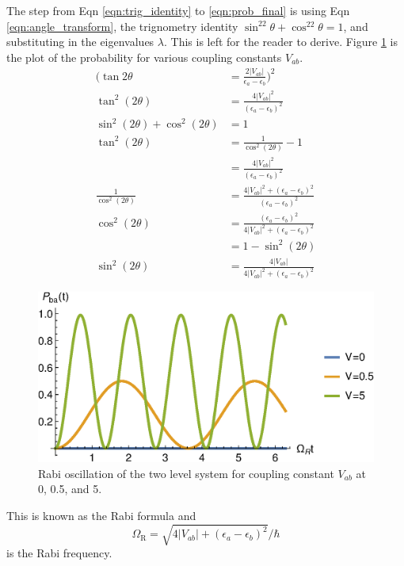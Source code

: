 \documentclass{article}
\begin{document}
The step from Eqn \eqref{eqn:trig_identity} to \eqref{eqn:prob_final}
is using Eqn \eqref{eqn:angle_transform}, the trignometry identity
$\sin^22\theta + \cos^22\theta = 1$, and substituting in the eigenvalues $\lambda$.
This is left for the reader to derive. Figure \ref{fig:prob} is the plot of
the probability for various coupling constants $V_{ab}$.
\begin{align*}
  \Bigg(\tan 2\theta & =  \frac{2|V_{ab}|}{\epsilon_a-\epsilon_b}\Bigg)^2 \\
  \tan^2(2\theta) & = \frac{4|V_{ab}|^2}{(\epsilon_a-\epsilon_b)^2} \\
  \sin^2(2\theta) + \cos^2(2\theta) & = 1 \\
  \tan^2(2\theta) & = \frac{1}{\cos^2(2\theta)} - 1 \\
  & = \frac{4|V_{ab}|^2}{(\epsilon_a-\epsilon_b)^2} \\
  \frac{1}{\cos^2(2\theta)} & = \frac{4|V_{ab}|^2 + (\epsilon_a-\epsilon_b)^2}{(\epsilon_a-\epsilon_b)^2} \\
  \cos^2(2\theta) & = \frac{(\epsilon_a-\epsilon_b)^2}{4|V_{ab}|^2 + (\epsilon_a-\epsilon_b)^2} \\
  & = 1 - \sin^2(2\theta) \\
  \sin^2(2\theta) & = \frac{4|V_{ab}|}{4|V_{ab}|^2 + (\epsilon_a-\epsilon_b)^2}
\end{align*}
\begin{figure}[hbpt]
  \centering
  \includegraphics[scale=0.8]{prob2.eps}
  \caption{Rabi oscillation of the two level system for coupling constant $V_{ab}$ at 0, 0.5, and
  5.}
  \label{fig:prob}
\end{figure}
This is known as the Rabi formula and
\begin{equation}
  \Omega_{\text{R}}=\sqrt{4|V_{ab}|+(\epsilon_a-\epsilon_b)^2}/\hbar
\end{equation}
is the Rabi frequency.
\end{document}
